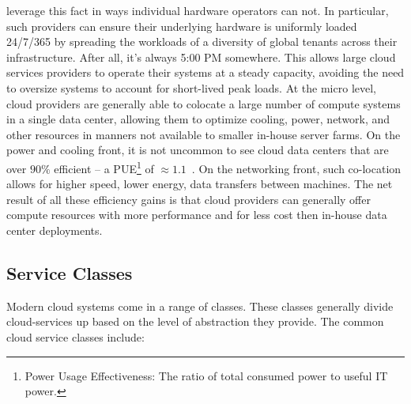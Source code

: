 \begin{packed_desc}
  leverage this fact in ways individual hardware operators can not. In
  particular, such providers can ensure their underlying hardware is
  uniformly loaded 24/7/365 by spreading the workloads of a diversity
  of global tenants across their infrastructure. After all, it's
  always 5:00 PM somewhere. This allows large cloud services providers
  to operate their systems at a steady capacity, avoiding the need to
  oversize systems to account for short-lived peak loads. At the micro
  level, cloud providers are generally able to colocate a large number
  of compute systems in a single data center, allowing them to
  optimize cooling, power, network, and other resources in manners not
  available to smaller in-house server farms. On the power and cooling
  front, it is not uncommon to see cloud data centers that are over
  $90\%$ efficient -- a PUE\footnote{Power Usage Effectiveness: The
    ratio of total consumed power to useful IT power.} of
  $\approx1.1$~\cite{google-efficiency}. On the networking front, such
  co-location allows for higher speed, lower energy, data transfers
  between machines. The net result of all these efficiency gains is
  that cloud providers can generally offer compute resources with more
  performance and for less cost then in-house data center deployments.
\end{packed_desc}

\subsection{Service Classes}

Modern cloud systems come in a range of classes. These classes
generally divide cloud-services up based on the level of abstraction
they provide. The common cloud service classes include:

